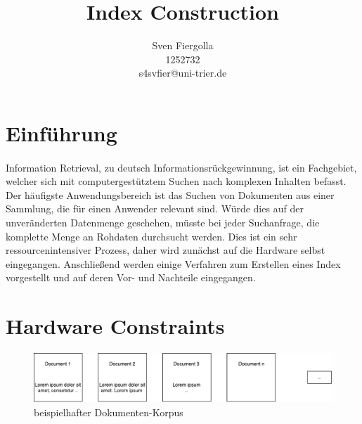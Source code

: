 


\usepackage{amsmath}
\usepackage[]{algorithm2e}
\usepackage[]{csquotes}
\usepackage{subfigure}

\author{Sven Fiergolla \\ 1252732 \\ s4svfier@uni-trier.de}
\title{Index Construction}

\hypersetup{
    colorlinks=true,
    linkcolor=black,
    urlcolor=blue
}



\LinesNumbered
\maketitle

\section{Einführung}
\paragraph{}
Information Retrieval, zu deutsch Informationsrückgewinnung, ist ein Fachgebiet, welcher sich mit computergestütztem Suchen nach komplexen Inhalten befasst. Der häufigste Anwendungsbereich ist das Suchen von Dokumenten aus einer Sammlung, die für einen Anwender relevant sind. Würde dies auf der unveränderten Datenmenge geschehen, müsste bei jeder Suchanfrage, die komplette Menge an Rohdaten durchsucht werden. Dies ist ein sehr ressourcenintensiver Prozess, daher wird zunächst auf die Hardware selbst eingegangen. Anschließend werden einige Verfahren zum Erstellen eines Index vorgestellt und auf deren Vor- und Nachteile eingegangen.\par

\section{Hardware Constraints}
\begin{figure}[ht]
  \includegraphics[width=\textwidth]{pdf/Documents.pdf}
  \caption{beispielhafter Dokumenten-Korpus}
  \label{korpus}
\end{figure}

